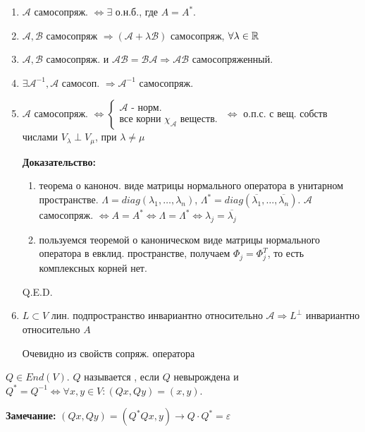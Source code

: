 \begin{enumerate}
    \item $\mathcal{A}$ самосопряж. $\Leftrightarrow \exists $ о.н.б., где $A = A^*$. 
    \item $\mathcal{A}, \mathcal{B}$ самосопряж $\Rightarrow (\mathcal{A}+\lambda \mathcal{B})$ самосопряж, $\forall \lambda \in \mathbb{R}$
    \item $\mathcal{A},\mathcal{B}$ самосопряж. и $\mathcal{A}\mathcal{B}=\mathcal{BA}\Rightarrow \mathcal{AB}$ самосопряженный.
    \item $\exists \mathcal{A}^{-1},\mathcal{A}$ самосоп. $\Rightarrow \mathcal{A}^{-1}$ самосопряж.
    \item $\mathcal{A}$ самосопряж. $\Leftrightarrow \begin{cases}
        \mathcal{A} \text{ - норм.}\\
        \text{все корни $\chi_{\mathcal{A}}$ веществ.   }
    \end{cases} \Leftrightarrow$ о.п.с. с вещ. собств числами $V_\lambda \perp V_\mu$, при $\lambda\neq \mu$

    \textbf{Доказательство:}

    \begin{enumerate}
        \item теорема о каноноч. виде матрицы нормального оператора в унитарном пространстве. $\Lambda = diag (\lambda_1,\ldots, \lambda_n)$, $\Lambda^* = diag(\overline{\lambda_1},\ldots,\overline{\lambda_n})$. $\mathcal{A}$ самосопряж. $\Leftrightarrow A = A^* \Leftrightarrow \Lambda = \Lambda^* \Leftrightarrow \lambda_j = \overline{\lambda_j}$
        \item пользуемся теоремой о каноническом виде матрицы нормального оператора в евклид. пространстве, получаем $\Phi_j = \Phi_j^T$, то есть комплексных корней нет.
    \end{enumerate}

    \hfill Q.E.D.


    \item $L \subset V$ лин. подпространство инвариантно относительно $\mathcal{A} \Rightarrow L^\perp$ инвариантно относительно $A$

    Очевидно из свойств сопряж. оператора
\end{enumerate}


 $Q\in End(V)$. $Q$ называется , если $Q$ невырождена  и $Q^*=Q^{-1} \Leftrightarrow \forall x,y \in V: (Qx,Qy)= (x,y)$. 

\textbf{Замечание:}  $(Qx,Qy) = (Q^*Qx,y) \rightarrow{ Q \cdot Q^* = \varepsilon}$


